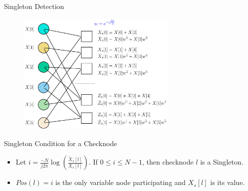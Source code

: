 \documentclass[10pt,xcolor=table]{beamer}
\begin{document}
	\begin{frame}{Singleton Detection}
			
		
			\vspace{-5pt}
			\begin{figure}[t]
				
				\includegraphics[width=3.0in]{./Figures/Factorgraph_example_tilde}
			\end{figure}
			\begin{block}{Singleton Condition for a Checknode}
			\begin{itemize}
				\item Let $i=\frac{-N}{j2\pi} \log(\frac{\tilde{X}_s[l]}{X_s[l]})$. If {\color{blue} $0 \leq i \leq N-1$}, then checknode $l$ is a \alert{Singleton}.\\ 
				\item $Pos(l) = i$ is the only variable node participating and $X_s[l]$ is its value.
			\end{itemize}
				
			\end{block}
			
	\end{frame}	
\end{document}
